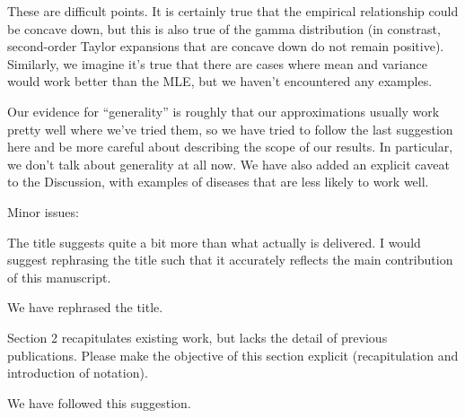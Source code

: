 \documentclass[12pt]{article}
\newcommand{\revtext}{\textsf}
\begin{document}
These are difficult points. It is certainly true that the empirical relationship could be concave down, but this is also true of the gamma distribution (in constrast, second-order Taylor expansions that are concave down do not remain positive). Similarly, we imagine it's true that there are cases where mean and variance would work better than the MLE, but we haven't encountered any examples.

Our evidence for ``generality'' is roughly that our approximations usually work pretty well where we've tried them, so we have tried to follow the last suggestion here and be more careful about describing the scope of our results. In particular, we don't talk about generality at all now. We have also added an explicit caveat to the Discussion, with examples of diseases that are less likely to work well.

\revtext{Minor issues:}

\revtext{The title suggests quite a bit more than what actually is delivered. I would suggest rephrasing the title such that it accurately reflects the main contribution of this manuscript.}

We have rephrased the title.

\revtext{Section 2 recapitulates existing work, but lacks the detail of previous publications. Please make the objective of this section explicit (recapitulation and introduction of notation).}

We have followed this suggestion.
\end{document}
